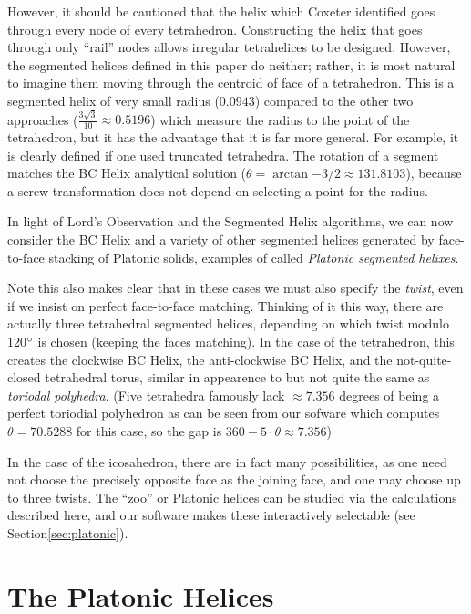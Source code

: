\documentclass[11pt]{article}
\begin{document}
{However, it should be cautioned that the helix which Coxeter identified\cite{coxeter1985simplicial} goes through every node of every tetrahedron. Constructing the helix that goes
through only ``rail'' nodes allows irregular tetrahelices to be designed\cite{read2018transforming}.
However, the segmented helices defined in this paper do neither; rather, it is most natural to
imagine them moving through the centroid of face of a tetrahedron.
This is a segmented helix of
very small radius ($0.0943$) compared to the other two approaches
($\frac{3\sqrt{3}}{10} \approx 0.5196$) which measure the radius to the
point of the tetrahedron, but it has
the advantage that it is far more general. For example, it is
clearly defined if one used truncated tetrahedra.
The rotation of a
segment matches the BC Helix analytical solution
($\theta = \arctan{-3/2} \approx 131.8103$),
because a screw transformation does not depend on selecting a point for the radius.

In light of Lord's Observation and the Segmented Helix algorithms, we can now
consider the BC Helix and a variety of other segmented helices generated by
face-to-face stacking of Platonic solids, examples of called {\em Platonic segmented helixes}.

Note this also makes clear that in these cases we must also specify the {\em twist},
even if we insist on perfect face-to-face matching. Thinking of it this
way, there are actually three tetrahedral segmented helices,
depending on which twist modulo 120$\degree$
is chosen (keeping the faces matching). In the case of the tetrahedron,
this creates the clockwise BC Helix, the anti-clockwise BC Helix, and the
not-quite-closed tetrahedral torus, similar in appearence to but not quite the same as
{\em toriodal polyhedra}\cite{wiki:toroidalpolyhedra}.
(Five tetrahedra famously lack $\approx 7.356$ degrees of being a perfect toriodial polyhedron
as can be seen from our sofware which computes $\theta = 70.5288$ for this case,
so the gap is $360 - 5 \cdot \theta \approx 7.356$)

In the case of the icosahedron, there are in fact many possibilities,
as one need not choose the precisely opposite face as the joining face, and
one may choose up to three twists. The ``zoo'' or Platonic helices
can be studied via the calculations described here, and our software
makes these interactively selectable (see Section\ref{sec:platonic}).


\section{The Platonic Helices}

}
\end{document}
